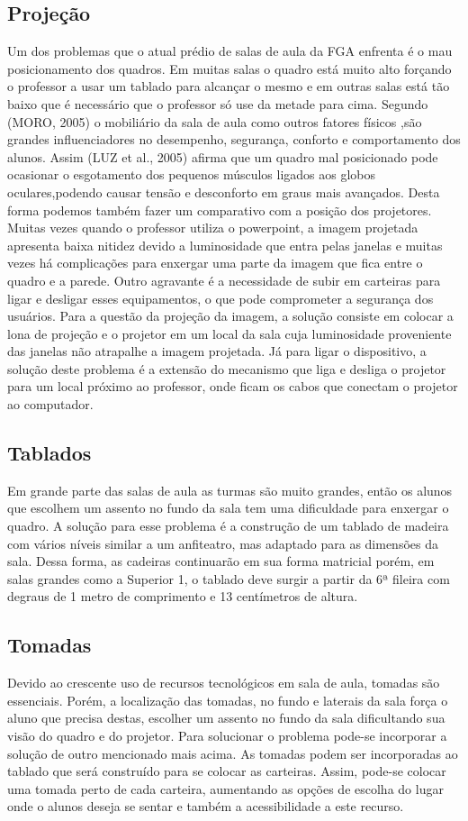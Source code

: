 \subsection{Projeção}
Um dos problemas que o atual prédio de salas de aula da FGA enfrenta é o mau posicionamento dos quadros. Em muitas salas o quadro está muito alto forçando o professor a usar um tablado para alcançar o mesmo e em outras salas está tão baixo que é necessário que o professor só use da metade para cima. Segundo (MORO, 2005) o mobiliário da sala de aula como outros fatores físicos ,são grandes influenciadores no desempenho, segurança, conforto e comportamento dos alunos. Assim (LUZ et al., 2005) afirma que um quadro mal posicionado pode ocasionar o esgotamento dos pequenos músculos ligados aos globos oculares,podendo causar tensão e desconforto em graus mais avançados. 
Desta forma podemos também fazer um comparativo com a posição dos projetores. Muitas vezes quando o professor utiliza o powerpoint, a imagem projetada apresenta baixa nitidez devido a luminosidade que entra pelas janelas e muitas vezes há complicações para enxergar uma parte da imagem que fica entre o quadro e a parede. Outro agravante é a necessidade de subir em carteiras para ligar e desligar esses equipamentos, o que pode comprometer a segurança dos usuários.
Para a questão da projeção da imagem, a solução consiste em colocar a lona de projeção e o projetor em um local da sala cuja luminosidade proveniente das janelas não atrapalhe a imagem projetada. Já para ligar o dispositivo, a solução deste problema é a extensão do mecanismo que liga e desliga o projetor para um local próximo ao professor, onde ficam os cabos que conectam o projetor ao computador.

\subsection{Tablados}
Em grande parte das salas de aula as turmas são muito grandes, então os alunos que escolhem um assento no fundo da sala tem uma dificuldade para enxergar o quadro. A solução para esse problema é a construção de um tablado de madeira com vários níveis similar a um anfiteatro, mas adaptado para as dimensões da sala. Dessa forma, as cadeiras continuarão em sua forma matricial porém, em salas grandes como a Superior 1, o tablado deve surgir a partir da 6ª fileira com degraus de 1 metro de comprimento e 13 centímetros de altura.

\subsection{Tomadas}
Devido ao crescente uso de recursos tecnológicos em sala de aula, tomadas são essenciais. Porém, a localização das tomadas, no fundo e laterais da sala força o aluno que precisa destas, escolher um assento no fundo da sala dificultando sua visão do quadro e do projetor. Para solucionar o problema pode-se incorporar a solução de outro mencionado mais acima. As tomadas podem ser incorporadas ao tablado que será construído para se colocar as carteiras. Assim, pode-se colocar uma tomada perto de cada carteira, aumentando as opções de escolha do lugar onde o alunos deseja se sentar e também a acessibilidade a este recurso.

